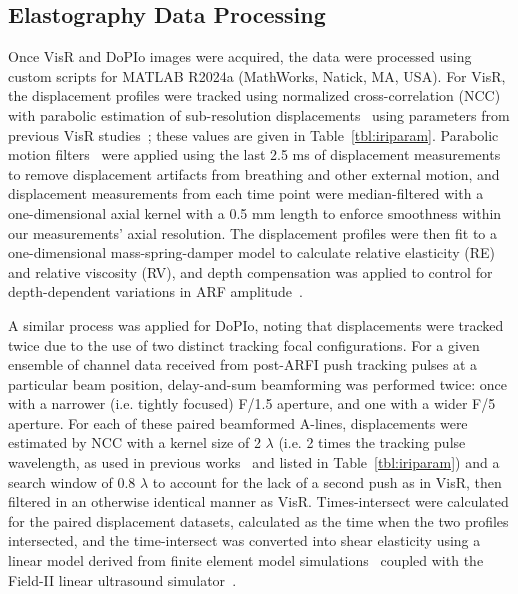 \subsection{Elastography Data Processing}

Once VisR and DoPIo images were acquired, the data were processed using custom scripts for MATLAB R2024a (MathWorks, Natick, MA, USA). For VisR, the displacement profiles were tracked using normalized cross-correlation (NCC) with parabolic estimation of sub-resolution displacements~\cite{pinton_Rapid_2006} using parameters from previous VisR studies~\cite{hossain_vivo_2017,hossain_Mechanical_2019}; these values are given in Table~\ref{tbl:iriparam}. Parabolic motion filters~\cite{giannantonio_Comparison_2011} were applied using the last 2.5 ms of displacement measurements to remove displacement artifacts from breathing and other external motion, and displacement measurements from each time point were median-filtered with a one-dimensional axial kernel with a 0.5 mm length to enforce smoothness within our measurements' axial resolution. The displacement profiles were then fit to a one-dimensional mass-spring-damper model to calculate relative elasticity (RE) and relative viscosity (RV), and depth compensation was applied to control for depth-dependent variations in ARF amplitude~\cite{hossain_Evaluating_2018}.

A similar process was applied for DoPIo, noting that displacements were tracked twice due to the use of two distinct tracking focal configurations. For a given ensemble of channel data received from post-ARFI push tracking pulses at a particular beam position, delay-and-sum beamforming was performed twice: once with a narrower (i.e. tightly focused) F/1.5 aperture, and one with a wider F/5 aperture. For each of these paired beamformed A-lines, displacements were estimated by NCC with a kernel size of 2 $\lambda$ (i.e. 2 times the tracking pulse wavelength, as used in previous works~\cite{yokoyama_Assessing_2021, yokoyama_Quantitative_2022,yokoyama_DoubleProfile_2025} and listed in Table~\ref{tbl:iriparam}) and a search window of 0.8 $\lambda$ to account for the lack of a second push as in VisR, then filtered in an otherwise identical manner as VisR. Times-intersect were calculated for the paired displacement datasets, calculated as the time when the two profiles intersected, and the time-intersect was converted into shear elasticity using a linear model derived from finite element model simulations~\cite{palmeri_Ultrasonic_2006} coupled with the Field-II linear ultrasound simulator~\cite{jensen_Calculation_1992, jensen_Field_1997}.

